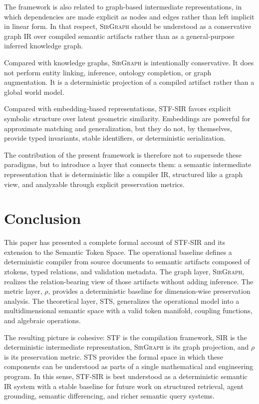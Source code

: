 \documentclass{article}
\newcommand{\STF}{{\normalfont\textsc{STF}}}
\newcommand{\SIR}{{\normalfont\textsc{SIR}}}
\newcommand{\STS}{{\normalfont\textsc{STS}}}
\newcommand{\SirGraphName}{{\normalfont\textsc{SirGraph}}}
\begin{document}
The framework is also related to graph-based intermediate representations, in which dependencies are made explicit as nodes and edges rather than left implicit in linear form. In that respect, \SirGraphName{} should be understood as a conservative graph IR over compiled semantic artifacts rather than as a general-purpose inferred knowledge graph.

Compared with knowledge graphs, \SirGraphName{} is intentionally conservative. It does not perform entity linking, inference, ontology completion, or graph augmentation. It is a deterministic projection of a compiled artifact rather than a global world model.

Compared with embedding-based representations, \STF{}-\SIR{} favors explicit symbolic structure over latent geometric similarity. Embeddings are powerful for approximate matching and generalization, but they do not, by themselves, provide typed invariants, stable identifiers, or deterministic serialization.

The contribution of the present framework is therefore not to supersede these paradigms, but to introduce a layer that connects them: a semantic intermediate representation that is deterministic like a compiler IR, structured like a graph view, and analyzable through explicit preservation metrics.

\section{Conclusion}

This paper has presented a complete formal account of \STF{}-\SIR{} and its extension to the Semantic Token Space. The operational baseline defines a deterministic compiler from source documents to semantic artifacts composed of ztokens, typed relations, and validation metadata. The graph layer, \SirGraphName{}, realizes the relation-bearing view of those artifacts without adding inference. The metric layer, \(\rho\), provides a deterministic baseline for dimension-wise preservation analysis. The theoretical layer, \STS{}, generalizes the operational model into a multidimensional semantic space with a valid token manifold, coupling functions, and algebraic operations.

The resulting picture is cohesive: \STF{} is the compilation framework, \SIR{} is the deterministic intermediate representation, \SirGraphName{} is its graph projection, and \(\rho\) is its preservation metric. \STS{} provides the formal space in which these components can be understood as parts of a single mathematical and engineering program. In this sense, \STF{}-\SIR{} is best understood as a deterministic semantic IR system with a stable baseline for future work on structured retrieval, agent grounding, semantic differencing, and richer semantic query systems.
\end{document}
